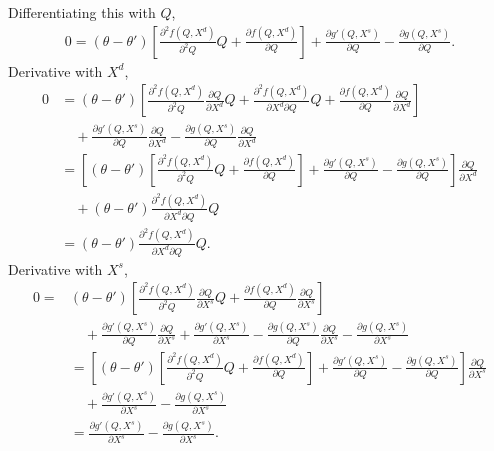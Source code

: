 \documentclass[11pt, a4paper]{article}
\theoremstyle{remark}
\begin{document}
Differentiating this with $Q$,
\begin{align}
    0 = (\theta - \theta')\left[ \frac{\partial^2 f(Q,X^{d})}{\partial^2 Q}Q + \frac{\partial f(Q,X^{d})}{\partial Q} \right] + \frac{\partial g'(Q,X^{s})}{\partial Q} - \frac{\partial g(Q,X^{s})}{\partial Q}.\label{eq:foc_with_Q}
\end{align}
Derivative with $X^{d}$,
\begin{align}
    0 & =  (\theta - \theta')\left[ \frac{\partial^2 f(Q,X^{d})}{\partial^2 Q}\frac{\partial Q}{\partial X^{d}} Q  + \frac{\partial^2 f(Q,X^{d})}{\partial X^{d}\partial Q}Q + \frac{\partial f(Q,X^{d})}{\partial Q} \frac{\partial Q}{\partial X^{d}}\right]\\
    &\quad + \frac{\partial g'(Q,X^{s})}{\partial Q}\frac{\partial Q}{\partial X^{d}} - \frac{\partial g(Q,X^{s})}{\partial Q}\frac{\partial Q}{\partial X^{d}}\\
    & = \left[(\theta - \theta')\left[ \frac{\partial^2 f(Q,X^{d})}{\partial^2 Q}Q + \frac{\partial f(Q,X^{d})}{\partial Q} \right] + \frac{\partial g'(Q,X^{s})}{\partial Q} - \frac{\partial g(Q,X^{s})}{\partial Q}\right] \frac{\partial Q}{\partial X^{d}}\\
    &\quad + (\theta - \theta')\frac{\partial^2 f(Q,X^{d})}{\partial X^{d}\partial Q}Q \\
    & = (\theta - \theta')\frac{\partial^2 f(Q,X^{d})}{\partial X^{d}\partial Q}Q.\label{eq:foc_with_X_d}
\end{align}
Derivative with $X^{s}$,
\begin{align}
    0 = & (\theta - \theta')\left[ \frac{\partial^2 f(Q,X^{d})}{\partial^2 Q}\frac{\partial Q}{\partial X^{s}} Q  + \frac{\partial f(Q,X^{d})}{\partial Q} \frac{\partial Q}{\partial X^{s}}\right]\\
    &\quad + \frac{\partial g'(Q,X^{s})}{\partial Q}\frac{\partial Q}{\partial X^{s}} + \frac{\partial g'(Q,X^{s})}{\partial X^{s}} - \frac{\partial g(Q,X^{s})}{\partial Q}\frac{\partial Q}{\partial X^{s}} - \frac{\partial g(Q,X^{s})}{\partial X^{s}}\\
    & = \left[(\theta - \theta')\left[ \frac{\partial^2 f(Q,X^{d})}{\partial^2 Q}Q + \frac{\partial f(Q,X^{d})}{\partial Q} \right] + \frac{\partial g'(Q,X^{s})}{\partial Q} - \frac{\partial g(Q,X^{s})}{\partial Q}\right] \frac{\partial Q}{\partial X^{s}}\\
    & \quad +  \frac{\partial g'(Q,X^{s})}{\partial X^{s}} -  \frac{\partial g(Q,X^{s})}{\partial X^{s}}\\
    & = \frac{\partial g'(Q,X^{s})}{\partial X^{s}} -  \frac{\partial g(Q,X^{s})}{\partial X^{s}}.\label{eq:foc_with_X_s}
\end{align}
\end{document}
